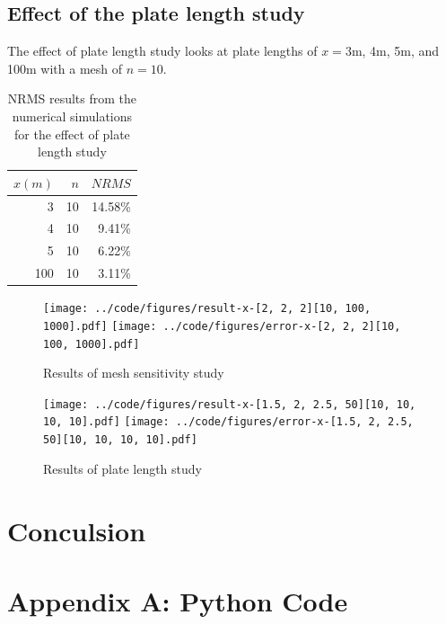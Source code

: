 \documentclass[twocolumn,10pt]{asme2ej}
\begin{document}
\subsection{Effect of the plate length study}
The effect of plate length study looks at plate lengths of $x = 3$m, 4m, 5m, and 100m with a mesh of $n = 10$.

\begin{table}[htb]
\begin{center}
\label{mesh_table}
\begin{tabular}{|r | r r|}
\hline
$x (m)$ & $n$ & $NRMS$ \\
\hline
3   & 10 & 14.58\%\\
4   & 10 & 9.41\%\\
5   & 10 & 6.22\%\\
100 & 10 & 3.11\%\\
\hline
\end{tabular}
\caption{NRMS results from the numerical simulations for the effect of plate length study}
\end{center}
\end{table}


\begin{figure}[tb]
\begin{center}
\texttt{[image: ../code/figures/result-x-[2, 2, 2][10, 100, 1000].pdf]}
\texttt{[image: ../code/figures/error-x-[2, 2, 2][10, 100, 1000].pdf]}
\caption{Results of mesh sensitivity study}
\label{sensitivity_study}
\texttt{[image: ../code/figures/result-x-[1.5, 2, 2.5, 50][10, 10, 10, 10].pdf]}
\texttt{[image: ../code/figures/error-x-[1.5, 2, 2.5, 50][10, 10, 10, 10].pdf]}
\caption{Results of plate length study}
\label{length_study}
\end{center}
\end{figure}


\section{Conculsion}




\clearpage
\onecolumn
\appendix       %
\section*{Appendix A: Python Code}



\end{document}
